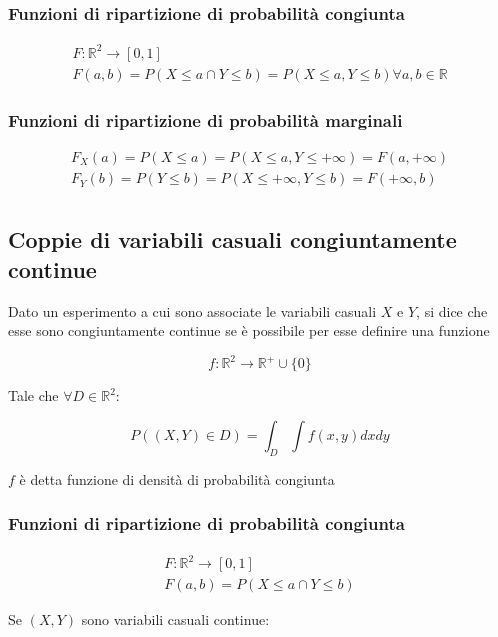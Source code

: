 \documentclass{subfiles}
\begin{document}
\subsubsection{Funzioni di ripartizione di probabilità congiunta}

$$
\begin{matrix}
F:\mathbb{R}^2 \to [0,1] \\
F(a,b) = P(X \leq a \cap Y \leq b) = P(X \leq a, Y \leq b) \forall a,b \in \mathbb{R}
\end{matrix}
$$

\subsubsection{Funzioni di ripartizione di probabilità marginali}

$$
\begin{matrix}
F_X(a) = P(X \leq a) = P(X \leq a, Y\leq+\infty) = F(a,+\infty) \\
F_Y(b) = P(Y \leq b) = P(X\leq+\infty, Y \leq b) = F(+\infty,b) \\
\end{matrix}
$$

\subsection{Coppie di variabili casuali congiuntamente continue}

Dato un esperimento a cui sono associate le variabili casuali $X$ e $Y$, si dice che esse sono congiuntamente continue se è possibile per esse definire una funzione

$$
f:\mathbb{R}^2 \to \mathbb{R}^+ \cup \{0\}
$$

\noindent
Tale che $\forall D \in \mathbb{R}^2$:

$$
P((X,Y) \in D) = \int_{D}\int f(x,y) dx dy
$$

\noindent
$f$ è detta funzione di densità di probabilità congiunta

\subsubsection{Funzioni di ripartizione di probabilità congiunta}

$$
\begin{matrix}
F:\mathbb{R}^2 \to [0,1] \\
F(a,b) = P(X \leq a \cap Y \leq b)
\end{matrix}
$$

Se $(X,Y)$ sono variabili casuali continue:
\end{document}
